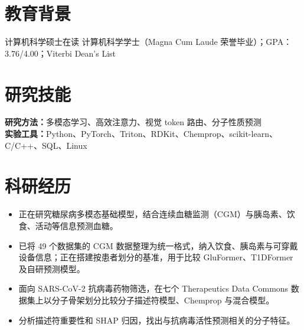\documentclass[10pt]{article}
\begin{document}
\chineseheader

\section{教育背景}
计算机科学硕士在读
计算机科学学士（Magna Cum Laude 荣誉毕业）；GPA：3.76/4.00；Viterbi Dean's List

\section{研究技能}
\textbf{研究方法：}多模态学习、高效注意力、视觉 token 路由、分子性质预测\\
\textbf{实验工具：}Python、PyTorch、Triton、RDKit、Chemprop、scikit-learn、C/C++、SQL、Linux

\section{科研经历}
\begin{itemize}
\item 正在研究糖尿病多模态基础模型，结合连续血糖监测（CGM）与胰岛素、饮食、活动等信息预测血糖。
\item 已将 49 个数据集的 CGM 数据整理为统一格式，纳入饮食、胰岛素与可穿戴设备信息；正在搭建按患者划分的基准，用于比较 GluFormer、T1DFormer 及自研预测模型。
\end{itemize}
\begin{itemize}
\item 面向 SARS-CoV-2 抗病毒药物筛选，在七个 Therapeutics Data Commons 数据集上以分子骨架划分比较分子描述符模型、Chemprop 与混合模型。
\item 分析描述符重要性和 SHAP 归因，找出与抗病毒活性预测相关的分子特征。
\end{itemize}
\end{document}
